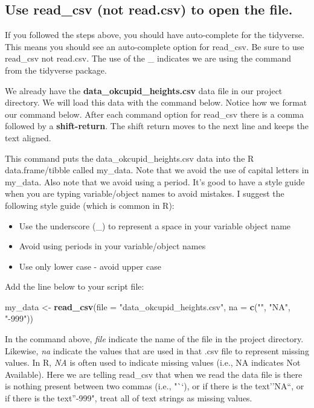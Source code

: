 \documentclass[
]{krantz}
\makeatletter
\newenvironment{Shaded}{\begin{snugshade}}{\end{snugshade}}
\newcommand{\DataTypeTok}[1]{\textcolor[rgb]{0.27,0.27,0.27}{#1}}
\newcommand{\KeywordTok}[1]{\textcolor[rgb]{0.27,0.27,0.27}{\textbf{#1}}}
\newcommand{\NormalTok}[1]{#1}
\newcommand{\StringTok}[1]{\textcolor[rgb]{0.5,0.5,0.5}{#1}}
\providecommand{\tightlist}{%
  \setlength{\itemsep}{0pt}\setlength{\parskip}{0pt}}
\newenvironment{kframe}{%
\medskip{}
\setlength{\fboxsep}{.8em}
 \def\at@end@of@kframe{}%
 \ifinner\ifhmode%
  \def\at@end@of@kframe{\end{minipage}}%
  \begin{minipage}{\columnwidth}%
 \fi\fi%
 \def\FrameCommand##1{\hskip\@totalleftmargin \hskip-\fboxsep
 \colorbox{shadecolor}{##1}\hskip-\fboxsep
     \hskip-\linewidth \hskip-\@totalleftmargin \hskip\columnwidth}%
 \MakeFramed {\advance\hsize-\width
   \@totalleftmargin\z@ \linewidth\hsize
   \@setminipage}}%
 {\par\unskip\endMakeFramed%
 \at@end@of@kframe}
\renewenvironment{Shaded}{\begin{kframe}}{\end{kframe}}
\makeatother
\begin{document}
\hypertarget{use-read_csv-not-read.csv-to-open-the-file.}{%
\subsection{Use read\_csv (not read.csv) to open the file.}\label{use-read_csv-not-read.csv-to-open-the-file.}}

If you followed the steps above, you should have auto-complete for the tidyverse. This means you should see an auto-complete option for read\_csv. Be sure to use read\_csv not read.csv. The use of the \_ indicates we are using the command from the tidyverse package.

We already have the \textbf{data\_okcupid\_heights.csv} data file in our project directory. We will load this data with the command below. Notice how we format our command below. After each command option for read\_csv there is a comma followed by a \textbf{shift-return}. The shift return moves to the next line and keeps the text aligned.

This command puts the data\_okcupid\_heights.csv data into the R data.frame/tibble called my\_data. Note that we avoid the use of capital letters in my\_data. Also note that we avoid using a period. It's good to have a style guide when you are typing variable/object names to avoid mistakes. I suggest the following style guide (which is common in R):

\begin{itemize}
\tightlist
\item
  Use the underscore (\_) to represent a space in your variable object name
\item
  Avoid using periods in your variable/object names
\item
  Use only lower case - avoid upper case
\end{itemize}

Add the line below to your script file:

\begin{Shaded}
\begin{Highlighting}[]
\NormalTok{my_data <-}\StringTok{ }\KeywordTok{read_csv}\NormalTok{(}\DataTypeTok{file =} \StringTok{"data_okcupid_heights.csv"}\NormalTok{, }
                    \DataTypeTok{na =} \KeywordTok{c}\NormalTok{(}\StringTok{""}\NormalTok{, }\StringTok{"NA"}\NormalTok{, }\StringTok{"-999"}\NormalTok{))}
\end{Highlighting}
\end{Shaded}

In the command above, \emph{file} indicate the name of the file in the project directory. Likewise, \emph{na} indicate the values that are used in that .csv file to represent missing values. In R, \emph{NA} is often used to indicate missing values (i.e., NA indicates Not Available). Here we are telling read\_csv that when we read the data file is there is nothing present between two commas (i.e., "``), or if there is the text''NA``, or if there is the text''-999", treat all of text strings as missing values.
\end{document}
